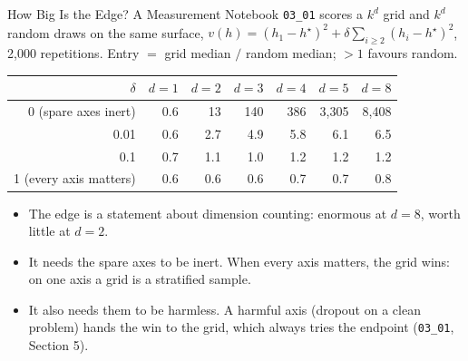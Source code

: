 \documentclass[aspectratio=169,11pt]{beamer}
\newcommand{\emphc}[1]{\textcolor{harvardcrimson}{#1}}
\begin{document}
\begin{frame}{How Big Is the Edge? A Measurement}
\small
\vspace{-0.15cm}
Notebook \texttt{03\_01} scores a $k^d$ grid and $k^d$ random draws on the same surface,
$v(h) = (h_1 - h^\star)^2 + \delta \sum_{i\ge2}(h_i - h^\star)^2$, 2{,}000 repetitions.
Entry $=$ grid median $/$ random median; $>1$ favours random.

\vspace{0.15cm}
\begin{center}
\renewcommand{\arraystretch}{1.1}
{\footnotesize
\begin{tabular}{@{}r rrrrrr@{}}
\toprule
$\delta$ & $d{=}1$ & $d{=}2$ & $d{=}3$ & $d{=}4$ & $d{=}5$ & $d{=}8$ \\
\midrule
0 (spare axes inert)     & 0.6 & 13 & 140 & 386 & 3{,}305 & 8{,}408 \\
0.01                     & 0.6 & 2.7 & 4.9 & 5.8 & 6.1 & 6.5 \\
0.1                      & 0.7 & 1.1 & 1.0 & 1.2 & 1.2 & 1.2 \\
1 (every axis matters)   & 0.6 & 0.6 & 0.6 & 0.7 & 0.7 & 0.8 \\
\bottomrule
\end{tabular}}
\end{center}

\vspace{0.15cm}
\begin{itemize}\itemsep1pt
  \item The edge is a statement about \emphc{dimension counting}: enormous at $d=8$, worth little at $d=2$.
  \item It needs the spare axes to be \emphc{inert}. When every axis matters, the grid wins: on one axis a grid is a stratified sample.
  \item It also needs them to be harmless. A harmful axis (dropout on a clean problem) hands the win to the grid, which always tries the endpoint (\texttt{03\_01}, Section 5).
\end{itemize}
\end{frame}
\end{document}

